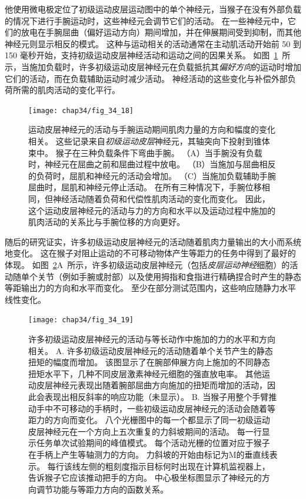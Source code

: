 他使用微电极定位了初级运动皮层运动图中的单个神经元，当猴子在没有外部负载的情况下进行手腕运动时，这些神经元会调节它们的活动。
在一些神经元中，它们的放电在手腕屈曲（偏好运动方向）期间增加，并在伸展期间受到抑制，而其他神经元则显示相反的模式。
这种与运动相关的活动通常在主动肌活动开始前 50 到 150 毫秒开始，支持初级运动皮层神经活动和运动之间的因果关系。
如图~\ref{fig:34_18}~所示，当施加负载时，许多初级运动皮层神经元在负载抵抗其\textit{偏好方向}的运动时增加它们的活动，而在负载辅助运动时减少活动。
神经活动的这些变化与补偿外部负荷所需的肌肉活动的变化平行。


\begin{figure}[htbp]
	\centering
	\texttt{[image: chap34/fig\_34\_18]}
	\caption{运动皮层神经元的活动与手腕运动期间肌肉力量的方向和幅度的变化相关。
		这些记录来自\textit{初级运动皮层}神经元，其轴突向下投射到锥体束中。
		猴子在三种负载条件下弯曲手腕。
		（A）当手腕没有负载时，神经元在屈曲之前和屈曲过程中放电。
		（B）当施加与屈曲相反的负荷时，屈肌和神经元的活动会增加。
		（C）当施加负载辅助手腕屈曲时，屈肌和神经元停止活动。
		在所有三种情况下，手腕位移相同，但神经活动随着负荷和代偿性肌肉活动的变化而变化。
		因此，这个运动皮层神经元的活动与力的方向和水平以及运动过程中施加的肌肉活动的关系比与手腕位移的方向更好\cite{evarts1968relation}。}
	\label{fig:34_18}
\end{figure}


随后的研究证实，许多初级运动皮层神经元的活动随着肌肉力量输出的大小而系统地变化。
这在猴子对阻止运动的不可移动物体产生等距力的任务中得到了最好的体现。
如图~\ref{fig:34_19}A~所示，许多初级运动皮层神经元（包括\textit{皮层运动神经}细胞）的活动随单个关节（例如手腕或肘部）以及使用拇指和食指进行精确捏合时产生的静态等距输出力的方向和水平而变化。
至少在部分测试范围内，这些响应随静力水平线性变化。


\begin{figure}[htbp]
	\centering
	\texttt{[image: chap34/fig\_34\_19]}
	\caption{许多初级运动皮层神经元的活动与等长动作中施加的力的水平和方向相关。
		A. 许多初级运动皮层神经元的活动随着单个关节产生的静态扭矩的幅度而增加。
		该图显示了在腕部伸展方向上施加的不同静态扭矩水平下，几种不同皮层激素神经元细胞的强直放电率。
		其他运动皮层神经元表现出随着腕部屈曲方向施加的扭矩而增加的活动，因此会表现出相反斜率的响应功能（未显示）\cite{fetz1980postspike}。
		B. 当猴子用整个手臂推动手中不可移动的手柄时，一些初级运动皮层神经元的活动会随着等距力的方向而变化。
		八个光栅图中的每一个都显示了同一初级运动皮层神经元在一个方向上五次重复的力斜坡期间的活动。
		每一行显示任务单次试验期间的峰值模式。
		每个活动光栅的位置对应于猴子在手柄上产生等轴测力的方向。
		力斜坡的开始由标记为M的垂直线表示。
		每行该线左侧的粗刻度指示目标何时出现在计算机监视器上，告诉猴子它应该推动把手的方向。
		中心极坐标图显示了神经元的方向调节功能与等距力方向的函数关系\cite{sergio2003systematic}。}
	\label{fig:34_19}
\end{figure}



